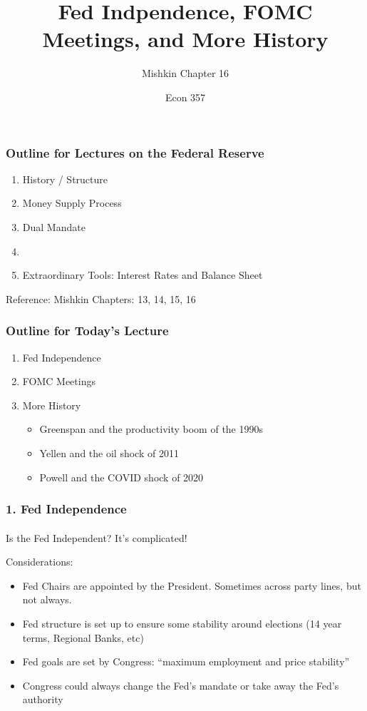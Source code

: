 \documentclass{beamer}
\title{Fed Indpendence, FOMC Meetings, and More History}
\subtitle{Mishkin Chapter 16}
\author{Econ 357}
\date{\week}
\begin{document}
\frame{\titlepage}

\begin{frame}
    \frametitle{Outline for Lectures on the Federal Reserve}

    \begin{enumerate}
        \item History / Structure
        \item Money Supply Process
        \item Dual Mandate
        \item {}
        \item Extraordinary Tools: Interest Rates and Balance Sheet
    \end{enumerate}
    \vspace{1em}
    Reference: Mishkin Chapters: 13, 14, 15, 16

\end{frame}

\begin{frame}
    \frametitle{Outline for Today's Lecture}
    
    \begin{enumerate}
        \item Fed Independence
        \item FOMC Meetings
        \item More History
        \begin{itemize}
            \item Greenspan and the productivity boom of the 1990s
            \item Yellen and the oil shock of 2011
            \item Powell and the COVID shock of 2020
        \end{itemize}
    \end{enumerate}

\end{frame}

\begin{frame}[t]
    \frametitle{1. Fed Independence}
    \framesubtitle{}
    
    Is the Fed Independent?   It’s complicated!
    \vspace{1em}
    
    Considerations:
    \begin{itemize}
        \item Fed Chairs are appointed by the President.  Sometimes across party lines, but not always.
        \item Fed structure is set up to ensure some stability around elections (14 year terms, Regional Banks, etc)
        \item Fed goals are set by Congress: “maximum employment and price stability”
        \item Congress could always change the Fed’s mandate or take away the Fed’s authority
    \end{itemize}
    
\end{frame}
\end{document}
